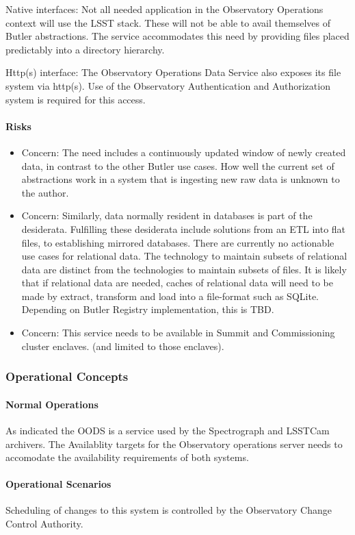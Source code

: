 Native interfaces: Not all needed application in the Observatory Operations context
will use the LSST stack. These will not be able to avail themselves of Butler abstractions.
The service accommodates this need by providing files placed predictably into a
directory hierarchy.

Http(s) interface: The Observatory Operations Data Service also exposes its
file system via http(s). Use of the Observatory Authentication and Authorization
system is required for this access.

\paragraph{Risks}

\begin{itemize}

\item Concern: The need includes a continuously updated window of newly created
data, in contrast to the other Butler use cases.  How well the current set of
abstractions work in a system that is ingesting new raw data  is unknown to the
author.

\item Concern: Similarly, data normally resident in databases is part of the desiderata.
Fulfilling these desiderata include solutions from an ETL into flat files, to
establishing mirrored databases. There are currently no actionable use cases
for relational data. The technology to maintain subsets of relational data are distinct
from the technologies to maintain subsets of files. It is likely that if relational data are
needed, caches of relational data will need to be made by extract, transform and load
into a file-format such as SQLite. Depending on Butler Registry implementation, this is TBD.  

\item Concern: This service needs to be available in Summit and Commissioning cluster enclaves. (and limited to those enclaves).

\end{itemize}

\subsubsection{Operational Concepts}

\paragraph{Normal Operations}

As indicated the OODS is a service used by the Spectrograph and LSSTCam archivers.
The Availablity targets for the
Observatory operations server needs to accomodate the availability requirements of both systems.

\paragraph{Operational Scenarios}

Scheduling of changes to this system is controlled by the Observatory Change Control Authority.
